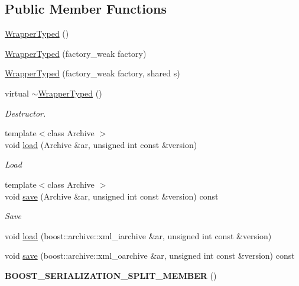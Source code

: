 \subsection*{\-Public \-Member \-Functions}
\begin{DoxyCompactItemize}
\item 
\hyperlink{classNeb_1_1WrapperTyped_ad3fa7c0392b93b571cca59809081c828}{\-Wrapper\-Typed} ()
\item 
\hyperlink{classNeb_1_1WrapperTyped_ab3ae54407d5d88247591a7d05d181b4a}{\-Wrapper\-Typed} (factory\-\_\-weak factory)
\item 
\hyperlink{classNeb_1_1WrapperTyped_a390ac7ae4c75440e417c85f042f0d6b4}{\-Wrapper\-Typed} (factory\-\_\-weak factory, shared s)
\item 
\hypertarget{classNeb_1_1WrapperTyped_acca2803bb2a5c1ca4b3b5ff51a04b421}{virtual \hyperlink{classNeb_1_1WrapperTyped_acca2803bb2a5c1ca4b3b5ff51a04b421}{$\sim$\-Wrapper\-Typed} ()}\label{classNeb_1_1WrapperTyped_acca2803bb2a5c1ca4b3b5ff51a04b421}

\begin{DoxyCompactList}\small\item\em \-Destructor. \end{DoxyCompactList}\item 
\hypertarget{classNeb_1_1WrapperTyped_a293a6083747b145c8b9db4a9f1410f89}{{\footnotesize template$<$class Archive $>$ }\\void \hyperlink{classNeb_1_1WrapperTyped_a293a6083747b145c8b9db4a9f1410f89}{load} (\-Archive \&ar, unsigned int const \&version)}\label{classNeb_1_1WrapperTyped_a293a6083747b145c8b9db4a9f1410f89}

\begin{DoxyCompactList}\small\item\em \-Load \end{DoxyCompactList}\item 
\hypertarget{classNeb_1_1WrapperTyped_a756a81384782fe7820f383ea989c9ec1}{{\footnotesize template$<$class Archive $>$ }\\void \hyperlink{classNeb_1_1WrapperTyped_a756a81384782fe7820f383ea989c9ec1}{save} (\-Archive \&ar, unsigned int const \&version) const }\label{classNeb_1_1WrapperTyped_a756a81384782fe7820f383ea989c9ec1}

\begin{DoxyCompactList}\small\item\em \-Save \end{DoxyCompactList}\item 
void \hyperlink{classNeb_1_1WrapperTyped_a2fffc14882368b94658a3cbc50ba2a99}{load} (boost\-::archive\-::xml\-\_\-iarchive \&ar, unsigned int const \&version)
\item 
void \hyperlink{classNeb_1_1WrapperTyped_aeece54c65d4e1edab4d51225b0944a3c}{save} (boost\-::archive\-::xml\-\_\-oarchive \&ar, unsigned int const \&version) const 
\item 
\hypertarget{classNeb_1_1WrapperTyped_a68f3e137a2c358c596f4358c3a15d1f8}{{\bfseries \-B\-O\-O\-S\-T\-\_\-\-S\-E\-R\-I\-A\-L\-I\-Z\-A\-T\-I\-O\-N\-\_\-\-S\-P\-L\-I\-T\-\_\-\-M\-E\-M\-B\-E\-R} ()}\label{classNeb_1_1WrapperTyped_a68f3e137a2c358c596f4358c3a15d1f8}

\end{DoxyCompactItemize}
